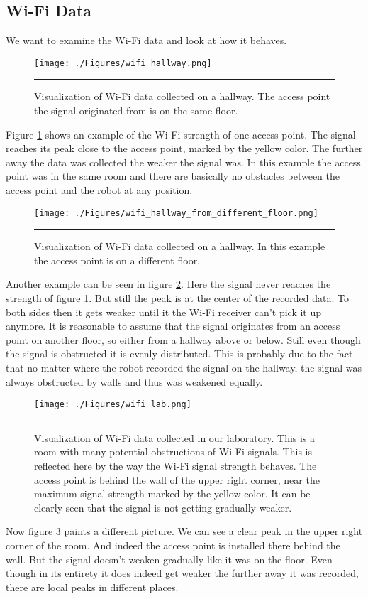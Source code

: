 \subsection{Wi-Fi Data}\label{sec:wifidata}
We want to examine the Wi-Fi data and look at how it behaves. 
\begin{figure}[htbp]
	\centering
		\texttt{[image: ./Figures/wifi\_hallway.png]}
		\rule{35em}{0.5pt}
	\caption[Hallway Wi-Fi data]{Visualization of Wi-Fi data collected on a hallway. The access point the signal originated from is on the same floor.}
	\label{fig:hallway_same_floor_wifi}
\end{figure}
Figure \ref{fig:hallway_same_floor_wifi} shows an example of the Wi-Fi strength of one access point. The signal reaches its peak close to the access point, marked by the yellow color. The further away the data was collected the weaker the signal was. In this example the access point was in the same room and there are basically no obstacles between the access point and the robot at any position. 
\begin{figure}[htbp]
	\centering
		\texttt{[image: ./Figures/wifi\_hallway\_from\_different\_floor.png]}
		\rule{35em}{0.5pt}
	\caption[Hallway Wi-Fi data]{Visualization of Wi-Fi data collected on a hallway. In this example the access point is on a different floor.}
	\label{fig:hallway_different_floor_wifi}
\end{figure}
Another example can be seen in figure \ref{fig:hallway_different_floor_wifi}. Here the signal never reaches the strength of figure \ref{fig:hallway_same_floor_wifi}. But still the peak is at the center of the recorded data. To both sides then it gets weaker until it the Wi-Fi receiver can't pick it up anymore. It is reasonable to assume that the signal originates from an access point on another floor, so either from a hallway above or below. Still even though the signal is obstructed it is evenly distributed. This is probably due to the fact that no matter where the robot recorded the signal on the hallway, the signal was always obstructed by walls and thus was weakened equally. 

\begin{figure}[htbp]
	\centering
		\texttt{[image: ./Figures/wifi\_lab.png]}
		\rule{35em}{0.5pt}
	\caption[Hallway Wi-Fi data]{Visualization of Wi-Fi data collected in our laboratory. This is a room with many potential obstructions of Wi-Fi signals. This is reflected here by the way the Wi-Fi signal strength behaves. The access point is behind the wall of the upper right corner, near the maximum signal strength marked by the yellow color. It can be clearly seen that the signal is not getting gradually weaker.}
	\label{fig:wifi_lab}
\end{figure}
Now figure \ref{fig:wifi_lab} paints a different picture. We can see a clear peak in the upper right corner of the room. And indeed the access point is installed there behind the wall. But the signal doesn't weaken gradually like it was on the floor. Even though in its entirety it does indeed get weaker the further away it was recorded, there are local peaks in different places. 

